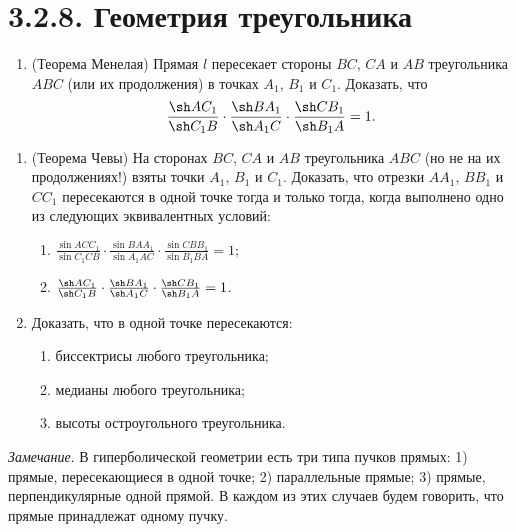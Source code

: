 	\section{3.2.8. Геометрия треугольника}
 
	\begin{enumerate}[resume*]
		\item (Теорема Менелая) Прямая $l$ пересекает стороны $BC$, $CA$ и $AB$ треугольника $ABC$ (или их продолжения) в точках $A_1$, $B_1$ и $C_1$. Доказать, что
		\[
			\frac{\sh AC_1}{\sh C_1 B} \cdot \frac{\sh BA_1}{\sh A_1 C} \cdot \frac{\sh CB_1}{\sh B_1 A} = 1.
		\]
	\end{enumerate}
	\begin{figure}[H]
		\centering
		\def\svgwidth{\columnwidth}
		{\Huge \scalebox{0.7}{} }
	\end{figure}
	\begin{enumerate}[resume*]
		\item (Теорема Чевы) На сторонах $BC$, $CA$ и $AB$ треугольника $ABC$ (но не на их продолжениях!) взяты точки $A_1$, $B_1$ и $C_1$. Доказать, что отрезки $AA_1$, $BB_1$ и $CC_1$ пересекаются в одной точке тогда и только тогда, когда выполнено одно из следующих эквивалентных условий:
		\begin{enumerate}
			\item $\frac{\sin ACC_1}{\sin C_1CB} \cdot \frac{\sin BAA_1}{\sin A_1AC} \cdot \frac{\sin CBB_1}{\sin B_1BA} = 1$;
			\item $\frac{\sh AC_1}{\sh C_1 B} \cdot \frac{\sh BA_1}{\sh A_1 C} \cdot \frac{\sh CB_1}{\sh B_1 A} = 1$.
		\end{enumerate}
 
		\item Доказать, что в одной точке пересекаются:
		\begin{enumerate}
			\item биссектрисы любого треугольника;
			\item медианы любого треугольника;
			\item высоты остроугольного треугольника.
		\end{enumerate}
	\end{enumerate}
 
	\textit{Замечание}. В гиперболической геометрии есть три типа пучков прямых: 1) прямые, пересекающиеся в одной точке; 2) параллельные прямые; 3) прямые, перпендикулярные одной прямой. В каждом из этих случаев будем говорить, что прямые принадлежат одному пучку.
 
